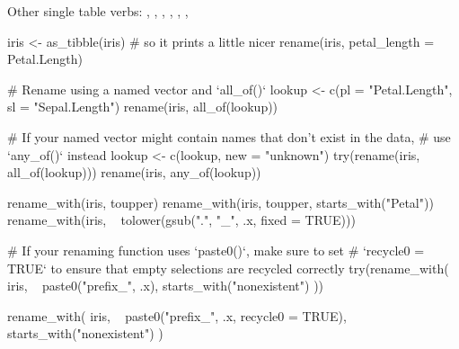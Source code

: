 \documentclass[a4paper]{book}
\begin{document}
%
\begin{SeeAlso}
Other single table verbs: 
,
,
,
,
,
,
\end{SeeAlso}
%
\begin{Examples}
\begin{ExampleCode}
iris <- as_tibble(iris) # so it prints a little nicer
rename(iris, petal_length = Petal.Length)

# Rename using a named vector and `all_of()`
lookup <- c(pl = "Petal.Length", sl = "Sepal.Length")
rename(iris, all_of(lookup))

# If your named vector might contain names that don't exist in the data,
# use `any_of()` instead
lookup <- c(lookup, new = "unknown")
try(rename(iris, all_of(lookup)))
rename(iris, any_of(lookup))

rename_with(iris, toupper)
rename_with(iris, toupper, starts_with("Petal"))
rename_with(iris, ~ tolower(gsub(".", "_", .x, fixed = TRUE)))


# If your renaming function uses `paste0()`, make sure to set
# `recycle0 = TRUE` to ensure that empty selections are recycled correctly
try(rename_with(
  iris,
  ~ paste0("prefix_", .x),
  starts_with("nonexistent")
))

rename_with(
  iris,
  ~ paste0("prefix_", .x, recycle0 = TRUE),
  starts_with("nonexistent")
)

\end{ExampleCode}
\end{Examples}
%
\end{document}
